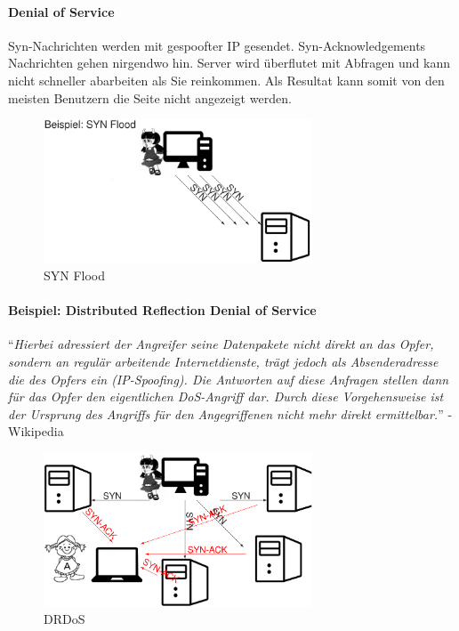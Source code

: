 \documentclass[10pt,a4paper]{article}
\begin{document}
\paragraph*{Denial of Service}Syn-Nachrichten werden mit gespoofter IP gesendet. Syn-Acknowledgements Nachrichten gehen nirgendwo hin.
Server wird überflutet mit Abfragen und kann nicht schneller abarbeiten als Sie reinkommen.
Als Resultat kann somit von den meisten Benutzern die Seite nicht angezeigt werden.
\begin{figure}[H]
    \begin{center}
    \includegraphics[width=8cm]{images/Syn-flood.png}
    \caption{SYN Flood}
    \label{Syn Flood}
    \end{center}
\end{figure}


\paragraph*{Beispiel: Distributed Reflection Denial of Service}
\noindent
"`\textsl{Hierbei adressiert der Angreifer seine Datenpakete nicht direkt an das Opfer, sondern an regulär arbeitende Internetdienste, trägt jedoch als Absenderadresse die des Opfers ein (IP-Spoofing). Die Antworten auf diese Anfragen stellen dann für das Opfer den eigentlichen DoS-Angriff dar. Durch diese Vorgehensweise ist der Ursprung des Angriffs für den Angegriffenen nicht mehr direkt ermittelbar.}"' - Wikipedia

\begin{figure}[H]
    \begin{center}
    \includegraphics[width=8cm]{images/DRDoS.png}
    \caption{DRDoS}
    \label{DRDoS}
    \end{center}
\end{figure}
\end{document}
